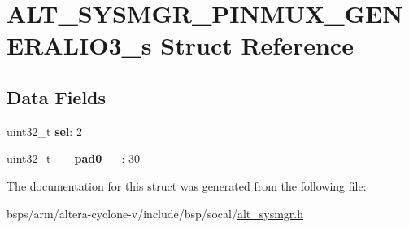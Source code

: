 \hypertarget{structALT__SYSMGR__PINMUX__GENERALIO3__s}{}\section{A\+L\+T\+\_\+\+S\+Y\+S\+M\+G\+R\+\_\+\+P\+I\+N\+M\+U\+X\+\_\+\+G\+E\+N\+E\+R\+A\+L\+I\+O3\+\_\+s Struct Reference}
\label{structALT__SYSMGR__PINMUX__GENERALIO3__s}
\subsection*{Data Fields}
\begin{DoxyCompactItemize}
\item 
\mbox{\label{structALT__SYSMGR__PINMUX__GENERALIO3__s_a05c77e7a77fe45c8e9f66b37c3cc7e63}} 
uint32\+\_\+t {\bfseries sel}\+: 2
\item 
\mbox{\label{structALT__SYSMGR__PINMUX__GENERALIO3__s_afd6e436bfeb3f0dbc42fa02466140230}} 
uint32\+\_\+t {\bfseries \+\_\+\+\_\+pad0\+\_\+\+\_\+}\+: 30
\end{DoxyCompactItemize}


The documentation for this struct was generated from the following file\+:\begin{DoxyCompactItemize}
\item 
bsps/arm/altera-\/cyclone-\/v/include/bsp/socal/\mbox{\hyperlink{alt__sysmgr_8h}{alt\+\_\+sysmgr.\+h}}\end{DoxyCompactItemize}
